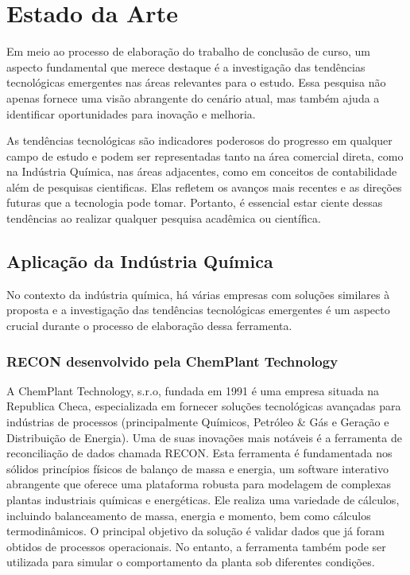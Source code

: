 \section{Estado da Arte}

Em meio ao processo de elaboração do trabalho de conclusão de curso, um aspecto fundamental que merece destaque é a investigação das tendências tecnológicas emergentes nas áreas relevantes para o estudo. Essa pesquisa não apenas fornece uma visão abrangente do cenário atual, mas também ajuda a identificar oportunidades para inovação e melhoria.

As tendências tecnológicas são indicadores poderosos do progresso em qualquer campo de estudo e podem ser representadas tanto na área comercial direta, como na Indústria Química, nas áreas adjacentes, como em conceitos de contabilidade além de pesquisas cientificas. Elas refletem os avanços mais recentes e as direções futuras que a tecnologia pode tomar. Portanto, é essencial estar ciente dessas tendências ao realizar qualquer pesquisa acadêmica ou científica.

\subsection{Aplicação da Indústria Química}

No contexto da indústria química, há várias empresas com soluções similares à proposta e a investigação das tendências tecnológicas emergentes é um aspecto crucial durante o processo de elaboração dessa ferramenta. 

\subsubsection{RECON desenvolvido pela ChemPlant Technology}

A ChemPlant Technology, s.r.o, fundada em 1991 é uma empresa situada na Republica Checa, especializada em fornecer soluções tecnológicas avançadas para indústrias de processos (principalmente Químicos, Petróleo & Gás e Geração e Distribuição de Energia). Uma de suas inovações mais notáveis é a ferramenta de reconciliação de dados chamada RECON. Esta ferramenta é fundamentada nos sólidos princípios físicos de balanço de massa e energia, um software interativo abrangente que oferece uma plataforma robusta para modelagem de complexas plantas industriais químicas e energéticas. Ele realiza uma variedade de cálculos, incluindo balanceamento de massa, energia e momento, bem como cálculos termodinâmicos. O principal objetivo da solução é validar dados que já foram obtidos de processos operacionais. No entanto, a ferramenta também pode ser utilizada para simular o comportamento da planta sob diferentes condições.

